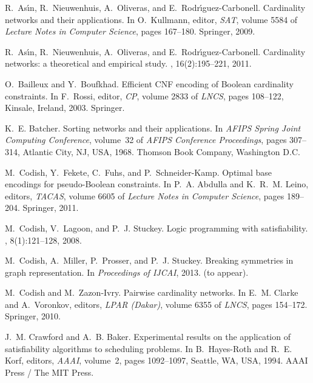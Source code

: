 \documentclass[runningheads,a4paper]{llncs}
\begin{document}
\newpage


\newcommand{\noopsort}[1]{}
\begin{thebibliography}{10}

R.~As\'{\i}n, R.~Nieuwenhuis, A.~Oliveras, and E.~Rodr\'{\i}guez-Carbonell.
\newblock Cardinality networks and their applications.
\newblock In O.~Kullmann, editor, {\em SAT}, volume 5584 of {\em Lecture Notes
  in Computer Science}, pages 167--180. Springer, 2009.

R.~As\'{\i}n, R.~Nieuwenhuis, A.~Oliveras, and E.~Rodr\'{\i}guez-Carbonell.
\newblock Cardinality networks: a theoretical and empirical study.
, 16(2):195--221, 2011.

O.~Bailleux and Y.~Boufkhad.
\newblock Efficient {CNF} encoding of {B}oolean cardinality constraints.
\newblock In F.~Rossi, editor, {\em CP}, volume 2833 of {\em LNCS}, pages
  108--122, Kinsale, Ireland, 2003. Springer.

K.~E. Batcher.
\newblock Sorting networks and their applications.
\newblock In {\em AFIPS Spring Joint Computing Conference}, volume~32 of {\em
  AFIPS Conference Proceedings}, pages 307--314, Atlantic City, NJ, USA, 1968.
  Thomson Book Company, Washington D.C.

M.~Codish, Y.~Fekete, C.~Fuhs, and P.~Schneider-Kamp.
\newblock Optimal base encodings for pseudo-{B}oolean constraints.
\newblock In P.~A. Abdulla and K.~R.~M. Leino, editors, {\em TACAS}, volume
  6605 of {\em Lecture Notes in Computer Science}, pages 189--204. Springer,
  2011.

M.~Codish, V.~Lagoon, and P.~J. Stuckey.
\newblock Logic programming with satisfiability.
, 8(1):121--128, 2008.

M.~Codish, A.~Miller, P.~Prosser, and P.~J. Stuckey.
\newblock Breaking symmetries in graph representation.
\newblock In {\em Proceedings of IJCAI}, 2013.
\newblock (to appear).

M.~Codish and M.~Zazon-Ivry.
\newblock Pairwise cardinality networks.
\newblock In E.~M. Clarke and A.~Voronkov, editors, {\em LPAR (Dakar)}, volume
  6355 of {\em LNCS}, pages 154--172. Springer, 2010.

J.~M. Crawford and A.~B. Baker.
\newblock Experimental results on the application of satisfiability algorithms
  to scheduling problems.
\newblock In B.~Hayes-Roth and R.~E. Korf, editors, {\em AAAI}, volume~2, pages
  1092--1097, Seattle, WA, USA, 1994. AAAI Press / The MIT Press.


\end{thebibliography}
\end{document}
